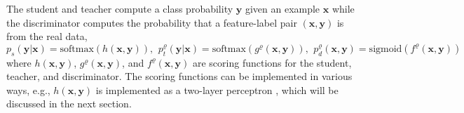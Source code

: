 \documentclass{article}
\newcommand{\OVEC}[1]{\bm{#1}} %
\newcommand{\EXP}{\mathbb{E}} %
\newcommand{\DTN}{\mathcal{L}_{\rm{D}}}
\newcommand{\fullpstd}[1]{p_{s}(#1|\OVEC{x})}
\newcommand{\fullptch}[1]{p_{t}^{\varrho}(#1|\OVEC{x})}
\newcommand{\fullpdis}[1]{p_{d}^{\varrho}(\OVEC{x},#1)}
\newcommand{\fullpcls}{p_{r}(\OVEC{y})}
\newcommand{\stdscore}{h(\OVEC{x},\OVEC{y})}
\newcommand{\tchscore}{g^{\varrho}(\OVEC{x},\OVEC{y})}
\newcommand{\disscore}{f^{\varrho}(\OVEC{x},\OVEC{y})}
\begin{document}
The student and teacher compute a class probability $\OVEC{y}$ given an example $\OVEC{x}$ while the discriminator computes the probability that a feature-label pair $(\OVEC{x}, \OVEC{y})$ is from the real data,
\begin{equation}
\fullpstd{\OVEC{y}}
=
\text{softmax}(\stdscore)
\text{, } \ 
\fullptch{\OVEC{y}}
=
\text{softmax}(\tchscore)
\text{, } \ 
\fullpdis{\OVEC{y}}
=
\text{sigmoid}(\disscore)
\end{equation}
where $\stdscore$, $\tchscore$, and $\disscore$ are scoring functions for the student, teacher, and discriminator.
The scoring functions can be implemented in various ways, e.g., $\stdscore$ is implemented as a two-layer perceptron \cite{lecun1998gradient}, which will be discussed in the next section.
\end{document}
